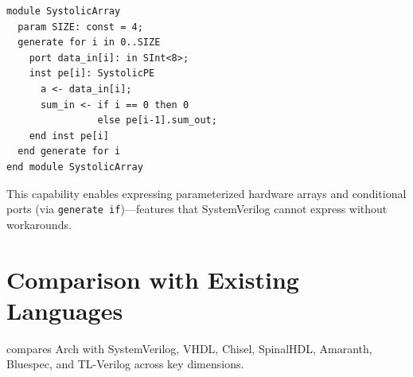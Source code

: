 \documentclass[11pt,twocolumn]{article}
\begin{document}
\begin{lstlisting}[language=Arch,caption={Generate for iteration},label={lst:gen}]
module SystolicArray
  param SIZE: const = 4;
  generate for i in 0..SIZE
    port data_in[i]: in SInt<8>;
    inst pe[i]: SystolicPE
      a <- data_in[i];
      sum_in <- if i == 0 then 0
                else pe[i-1].sum_out;
    end inst pe[i]
  end generate for i
end module SystolicArray
\end{lstlisting}

This capability enables expressing parameterized hardware arrays and conditional ports (via \texttt{generate if})---features that SystemVerilog cannot express without workarounds.

\section{Comparison with Existing Languages}\label{sec:comparison}

 compares Arch with SystemVerilog, VHDL, Chisel, SpinalHDL, Amaranth, Bluespec, and TL-Verilog across key dimensions.
\end{document}
